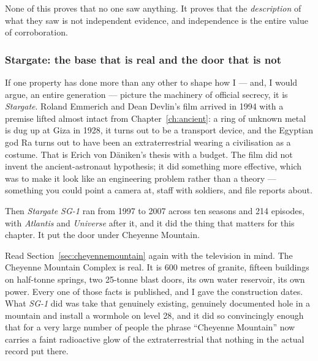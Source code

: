 None of this proves that no one saw anything. It proves that the \emph{description} of what they saw
is not independent evidence, and independence is the entire value of corroboration. 

\subsubsection{Stargate: the base that is real and the door that is not}

If one property has done more than any other to shape how I --- and, I would argue, an entire
generation --- picture the machinery of official secrecy, it is \emph{Stargate}. Roland Emmerich and
Dean Devlin's film arrived in 1994 with a premise lifted almost intact from Chapter~\ref{ch:ancient}:
a ring of unknown metal is dug up at Giza in 1928, it turns out to be a transport device, and the
Egyptian god Ra turns out to have been an extraterrestrial wearing a civilisation as a costume. That
is Erich von D\"aniken's thesis with a budget. The film did not invent the ancient-astronaut
hypothesis; it did something more effective, which was to make it look like an engineering problem
rather than a theory --- something you could point a camera at, staff with soldiers, and file reports
about.

Then \emph{Stargate SG-1} ran from 1997 to 2007 across ten seasons and 214 episodes, with
\emph{Atlantis} and \emph{Universe} after it, and it did the thing that matters for this chapter. It
put the door under Cheyenne Mountain.

Read Section~\ref{sec:cheyennemountain} again with the television in mind. The Cheyenne Mountain
Complex is real. It is 600 metres of granite, fifteen buildings on half-tonne springs, two 25-tonne
blast doors, its own water reservoir, its own power. Every one of those facts is published, and I
gave the construction dates. What \emph{SG-1} did was take that genuinely existing, genuinely
documented hole in a mountain and install a wormhole on level 28, and it did so convincingly enough
that for a very large number of people the phrase ``Cheyenne Mountain'' now carries a faint
radioactive glow of the extraterrestrial that nothing in the actual record put there.



